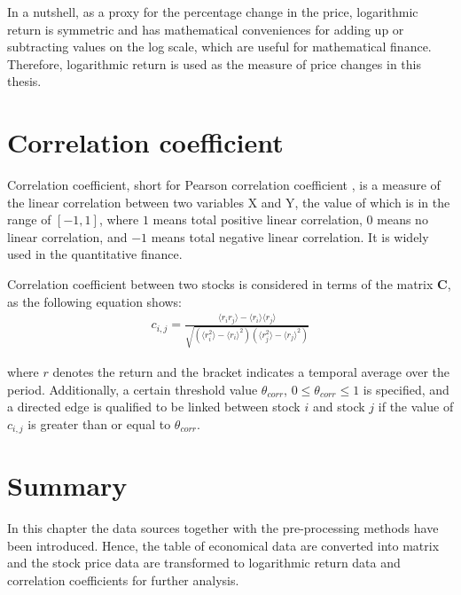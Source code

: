 In a nutshell, as a proxy for the percentage change in the price, logarithmic return is symmetric and has mathematical conveniences for adding up or subtracting values on the log scale, which are useful for mathematical finance. Therefore, logarithmic return is used as the measure of price changes in this thesis.

\section{Correlation coefficient}
Correlation coefficient, short for Pearson correlation coefficient \cite{pearson1895note}, is a measure of the linear correlation between two variables X and Y, the value of which is in the range of $\left[-1,1\right]$, where $1$ means total positive linear correlation, $0$ means no linear correlation, and $-1$ means total negative linear correlation. It is widely used in the quantitative finance. 

Correlation coefficient between two stocks is considered in terms of the matrix \textbf{C}, as the following equation shows:
\begin{eqnarray}\label{equ:corr}
c_{i,j}=\frac{\langle r_ir_j \rangle-\langle r_i\rangle \langle r_j\rangle}{\sqrt{(\langle r_i^2\rangle-\langle r_i\rangle^2)(\langle r_j^2\rangle-\langle r_j\rangle^2)}}
\end{eqnarray}

where $r$ denotes the return and the bracket indicates a temporal average over the period. Additionally, a certain threshold value $\theta_{corr}$, $0\leq \theta_{corr} \leq1$ is specified, and a directed edge is qualified to be linked between stock $i$ and stock $j$ if the value of $c_{i,j}$ is greater than or equal to $\theta_{corr}$.

\section{Summary}
In this chapter the data sources together with the pre-processing methods have been introduced. Hence, the table of economical data are converted into matrix and the stock price data are transformed to logarithmic return data and correlation coefficients for further analysis.
